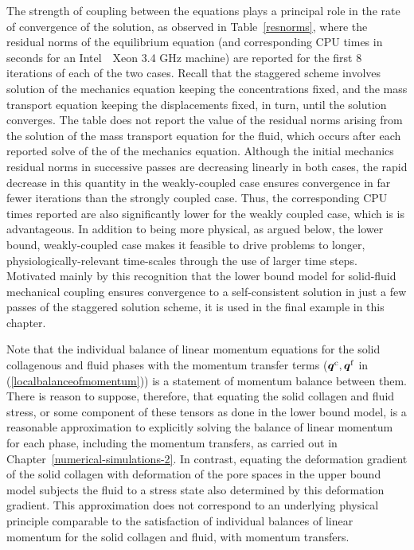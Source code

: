 The strength of coupling between the equations plays a principal role
in the rate of convergence of the solution, as observed in
Table~\ref{resnorms}, where the residual norms of the equilibrium
equation (and corresponding CPU times in seconds for an \mbox{Intel%
  \textregistered\ Xeon} 3.4 GHz machine) are reported for the first 8
iterations of each of the two cases. Recall that the staggered scheme
involves solution of the mechanics equation keeping the concentrations
fixed, and the mass transport equation keeping the displacements
fixed, in turn, until the solution converges. The table does not
report the value of the residual norms arising from the solution of
the mass transport equation for the fluid, which occurs after each
reported solve of the of the mechanics equation. Although the initial
mechanics residual norms in successive passes are decreasing linearly
in both cases, the rapid decrease in this quantity in the
weakly-coupled case ensures convergence in far fewer iterations than
the strongly coupled case. Thus, the corresponding CPU times reported
are also significantly lower for the weakly coupled case, which is is
advantageous. In addition to being more physical, as argued below, the
lower bound, weakly-coupled case makes it feasible to drive problems
to longer, physiologically-relevant time-scales through the use of
larger time steps. Motivated mainly by this recognition that the lower
bound model for solid-fluid mechanical coupling ensures convergence to
a self-consistent solution in just a few passes of the staggered
solution scheme, it is used in the final example in this chapter.

Note that the individual balance of linear momentum equations for the
solid collagenous and fluid phases with the momentum transfer terms
($\mbox{\boldmath$ q$}^\mathrm{c}, \mbox{\boldmath$ q$}^\mathrm{f}$ in (\ref{localbalanceofmomentum}))
is a statement of momentum balance between them. There is reason to
suppose, therefore, that equating the solid collagen and fluid stress,
or some component of these tensors as done in the lower bound model,
is a reasonable approximation to explicitly solving the balance of
linear momentum for each phase, including the momentum transfers, as
carried out in Chapter~\ref{numerical-simulations-2}. In contrast,
equating the deformation gradient of the solid collagen with
deformation of the pore spaces in the upper bound model subjects the
fluid to a stress state also determined by this deformation
gradient. This approximation does not correspond to an underlying
physical principle comparable to the satisfaction of individual
balances of linear momentum for the solid collagen and fluid, with
momentum transfers.

